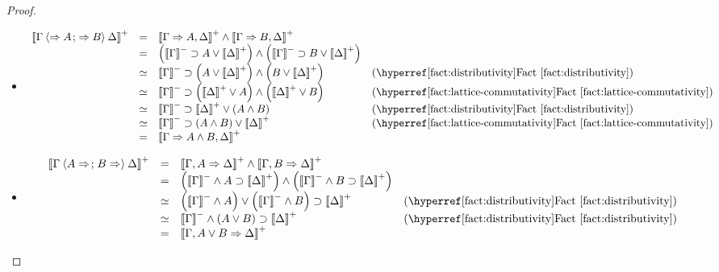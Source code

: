 \begin{proof}
\begin{itemize}
    \item[\rsf{\land{+}}]
    $$
    \begin{array}{rcll}
      \psint{\Gamma \piq{\seq A \sep \seq B} \Delta}
      &=& \psint{\Gamma \seq A, \Delta} \land \psint{\Gamma \seq B, \Delta} & \\
      &=& \left(\nsint{\Gamma} \limp A \lor \psint{\Delta}\right) \land \left(\nsint{\Gamma} \limp B \lor \psint{\Delta}\right) & \\
      &\semequiv& \nsint{\Gamma} \limp \left(A \lor \psint{\Delta}\right) \land \left(B \lor \psint{\Delta}\right) &\text{(\reffact{distributivity})} \\
      &\semequiv& \nsint{\Gamma} \limp \left(\psint{\Delta} \lor A\right) \land \left(\psint{\Delta} \lor B\right) &\text{(\reffact{lattice-commutativity})} \\
      &\semequiv& \nsint{\Gamma} \limp \psint{\Delta} \lor \left(A \land B\right) &\text{(\reffact{distributivity})} \\
      &\semequiv& \nsint{\Gamma} \limp \left(A \land B\right) \lor \psint{\Delta} &\text{(\reffact{lattice-commutativity})} \\
      &=& \psint{\Gamma \seq A \land B, \Delta} & \\
    \end{array}
    $$

    \item[\rsf{\lor{-}}]
    $$
    \begin{array}{rcll}
      \psint{\Gamma \piq{A \seq \sep B \seq} \Delta}
      &=& \psint{\Gamma, A \seq \Delta} \land \psint{\Gamma, B \seq \Delta} & \\
      &=& \left(\nsint{\Gamma} \land A \limp \psint{\Delta}\right) \land \left(\nsint{\Gamma} \land B \limp \psint{\Delta}\right) & \\
      &\semequiv& \left(\nsint{\Gamma} \land A\right) \lor \left(\nsint{\Gamma} \land B\right) \limp \psint{\Delta} &\text{(\reffact{distributivity})} \\
      &\semequiv& \nsint{\Gamma} \land \left(A \lor B\right) \limp \psint{\Delta} &\text{(\reffact{distributivity})} \\
      &=& \psint{\Gamma, A \lor B \seq \Delta} & \\
    \end{array}
    $$


\end{itemize}
\end{proof}

